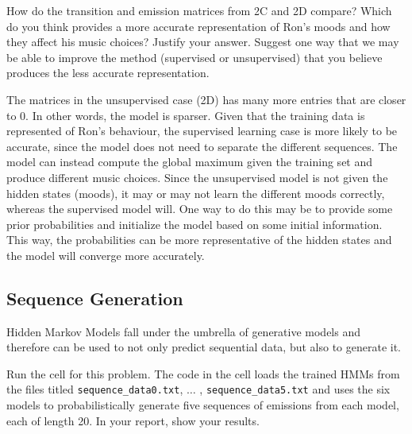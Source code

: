 \problem[5] How do the transition and emission matrices from 2C and 2D compare? Which do you think provides a more accurate representation of Ron's moods and how they affect his music choices? Justify your answer. Suggest one way that we may be able to improve the method (supervised or unsupervised) that you believe produces the less accurate representation. 

\begin{solution}
  The matrices in the unsupervised case (2D) has many more entries that are closer to 0. In other words, the model is sparser. Given that the training data is represented of Ron's behaviour, the supervised learning case is more likely to be accurate, since the model does not need to separate the different sequences. The model can instead compute the global maximum given the training set and produce different music choices. Since the unsupervised model is not given the hidden states (moods), it may or may not learn the different moods correctly, whereas the supervised model will. One way to do this may be to provide some prior probabilities and initialize the model based on some initial information. This way, the probabilities can be more representative of the hidden states and the model will converge more accurately.
\end{solution}

\subsection{Sequence Generation}
Hidden Markov Models fall under the umbrella of generative models and therefore can be used to not only predict sequential data, but also to generate it.

\newpage
\problem[5] Run the cell for this problem. The code in the cell loads the trained HMMs from the files titled \texttt{sequence_data0.txt}, $\ldots$ , \texttt{sequence_data5.txt} and uses the six models to probabilistically generate five sequences of emissions from each model, each of length 20. In your report, show your results. 

